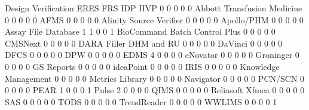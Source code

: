 \documentclass{article}
\begin{document}
\begin{Schunk}
\begin{Soutput}
                                Design Verification ERES FRS IDP IIVP
                                                  0    0   0   0    0
  Abbott Transfusion Medicine                     0    0   0   0    0
  AFMS                                            0    0   0   0    0
  Alinity Source Verifier                         0    0   0   0    0
  Apollo/PHM                                      0    0   0   0    0
  Assay File Database                             1    1   0   0    1
  BioCommand Batch Control Plus                   0    0   0   0    0
  CMSNext                                         0    0   0   0    0
  DARA Filler DHM and RU                          0    0   0   0    0
  DaVinci                                         0    0   0   0    0
  DFCS                                            0    0   0   0    0
  DPW                                             0    0   0   0    0
  EDMS                                            4    0   0   0    0
  eNovator                                        0    0   0   0    0
  Groninger                                       0    0   0   0    0
  GS Reports                                      0    0   0   0    0
  ideaPoint                                       0    0   0   0    0
  IRIS                                            0    0   0   0    0
  Knowledge Management                            0    0   0   0    0
  Metrics Library                                 0    0   0   0    0
  Navigator                                       0    0   0   0    0
  PCN/SCN                                         0    0   0   0    0
  PEAR                                            1    0   0   0    1
  Pulse                                           2    0   0   0    0
  QIMS                                            0    0   0   0    0
  Reliasoft Xfmea                                 0    0   0   0    0
  SAS                                             0    0   0   0    0
  TODS                                            0    0   0   0    0
  TrendReader                                     0    0   0   0    0
  WWLIMS                                          0    0   0   0    1
                               

\end{Soutput}
\end{Schunk}
\end{document}
